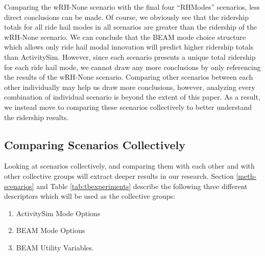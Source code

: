 \documentclass[12pt, oneside, openright]{byuthesis}
\providecommand{\tightlist}{%
  \setlength{\itemsep}{0pt}\setlength{\parskip}{0pt}}
\begin{document}
Comparing the wRH-None scenario with the final four ``RHModes'' scenarios, less direct conclusions can be made. Of course, we obviously see that the ridership totals for all ride hail modes in all scenarios are greater than the ridership of the wRH-None scenario. We can conclude that the BEAM mode choice structure which allows only ride hail modal innovation will predict higher ridership totals than ActivitySim. However, since each scenario presents a unique total ridership for each ride hail mode, we cannot draw any more conclusions by only referencing the results of the wRH-None scenario. Comparing other scenarios between each other individually may help us draw more conclusions, however, analyzing every combination of individual scenario is beyond the extent of this paper. As a result, we instead move to comparing these scenarios collectively to better understand the ridership results.

\hypertarget{res-col}{%
\subsection{Comparing Scenarios Collectively}\label{res-col}}

Looking at scenarios collectively, and comparing them with each other and with other collective groups will extract deeper results in our research. Section \ref{meth-scenarios} and Table \ref{tab:tbexperiments} describe the following three different descriptors which will be used as the collective groups:

\begin{enumerate}
\def\labelenumi{\arabic{enumi}.}
\tightlist
\item
  ActivitySim Mode Options
\item
  BEAM Mode Options
\item
  BEAM Utility Variables.
\end{enumerate}
\end{document}
